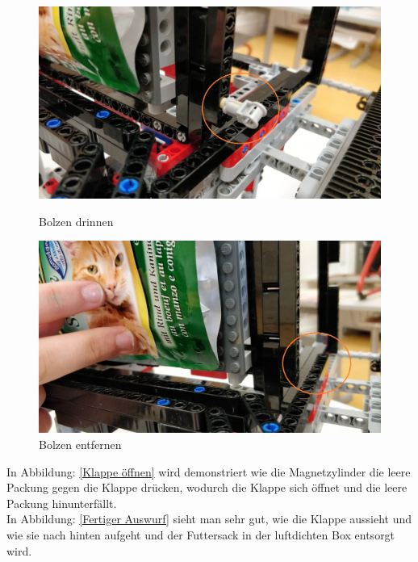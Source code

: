 \begin{figure}[H]
   \begin{minipage}[hbt]{0.5\textwidth} %
      \includegraphics[width=1\textwidth]{Bilder/Ablauf_1_png/Auswurf_2}
      \caption{Bolzen drinnen}
      \label{Bolzen drinnen}
   \end{minipage}
   \hspace{.04\linewidth}%
   \begin{minipage}[hbt]{0.5\textwidth} %
      \includegraphics[width=1\textwidth]{Bilder/Ablauf_1_png/Auswurf_3}
      \caption{Bolzen entfernen}
	  \label{Bolzen entfernen}      
      \end{minipage}
\end{figure}


In Abbildung: \ref{Klappe öffnen} wird demonstriert wie die Magnetzylinder die leere Packung gegen die Klappe drücken, wodurch die Klappe sich öffnet und die leere Packung hinunterfällt.\\

In Abbildung: \ref{Fertiger Auswurf} sieht man sehr gut, wie die Klappe aussieht und wie sie nach hinten aufgeht und der Futtersack in der luftdichten Box entsorgt wird.


